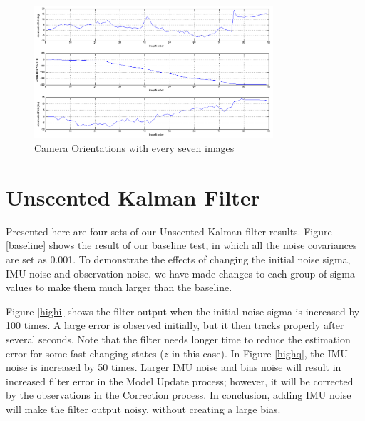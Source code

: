 \documentclass[letter, 10pt]{article}
\begin{document}
\begin{onehalfspacing}
\begin{enumerate}[leftmargin=2em,label={\alph*)}]
\begin{figure}[h!]
	\centering
	\includegraphics[width=0.79\textwidth]{orientation_int7.png}
	\caption{Camera Orientations with every seven images}
	\label{orient_int7}
\end{figure}

\end{enumerate}

\section{Unscented Kalman Filter}

Presented here are four sets of our Unscented Kalman filter results. Figure  \ref{baseline}
 shows the result of our baseline test, in which all the noise covariances are set as 0.001. To demonstrate the effects of changing the initial noise sigma, IMU noise and observation noise, we have made changes to each group of sigma values to make them much larger than the baseline. 
 
Figure \ref{highi} shows the filter output when the initial noise sigma is increased by 100 times. A large error is observed initially, but it then tracks properly after several seconds. Note that the filter needs longer time to reduce the estimation error for some fast-changing states ($z$ in this case).
In Figure \ref{highq}, the IMU noise is increased by 50 times. Larger IMU noise and bias noise will result in increased filter error in the Model Update process; however, it will be corrected by the observations in the Correction process. In conclusion, adding IMU noise will make the filter output noisy, without creating a large bias. 


\end{onehalfspacing}
\end{document}
